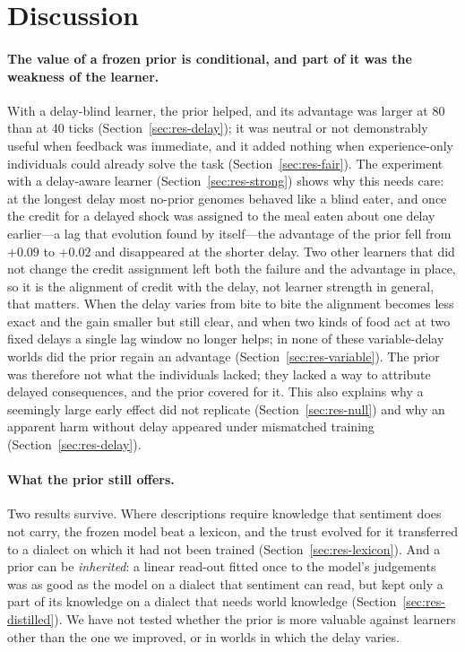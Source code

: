 \section{Discussion}
\label{sec:discussion}

\paragraph{The value of a frozen prior is conditional, and part of it was the weakness of the learner.}
With a delay-blind learner, the prior helped, and its advantage was larger at 80 than at 40 ticks (Section~\ref{sec:res-delay}); it was neutral or not demonstrably useful when feedback was immediate, and it added nothing when experience-only individuals could already solve the task (Section~\ref{sec:res-fair}). The experiment with a delay-aware learner (Section~\ref{sec:res-strong}) shows why this needs care: at the longest delay most no-prior genomes behaved like a blind eater, and once the credit for a delayed shock was assigned to the meal eaten about one delay earlier---a lag that evolution found by itself---the advantage of the prior fell from $+0.09$ to $+0.02$ and disappeared at the shorter delay. Two other learners that did not change the credit assignment left both the failure and the advantage in place, so it is the alignment of credit with the delay, not learner strength in general, that matters. When the delay varies from bite to bite the alignment becomes less exact and the gain smaller but still clear, and when two kinds of food act at two fixed delays a single lag window no longer helps; in none of these variable-delay worlds did the prior regain an advantage (Section~\ref{sec:res-variable}). The prior was therefore not what the individuals lacked; they lacked a way to attribute delayed consequences, and the prior covered for it. This also explains why a seemingly large early effect did not replicate (Section~\ref{sec:res-null}) and why an apparent harm without delay appeared under mismatched training (Section~\ref{sec:res-delay}).

\paragraph{What the prior still offers.}
Two results survive. Where descriptions require knowledge that sentiment does not carry, the frozen model beat a lexicon, and the trust evolved for it transferred to a dialect on which it had not been trained (Section~\ref{sec:res-lexicon}). And a prior can be \emph{inherited}: a linear read-out fitted once to the model's judgements was as good as the model on a dialect that sentiment can read, but kept only a part of its knowledge on a dialect that needs world knowledge (Section~\ref{sec:res-distilled}). We have not tested whether the prior is more valuable against learners other than the one we improved, or in worlds in which the delay varies.

